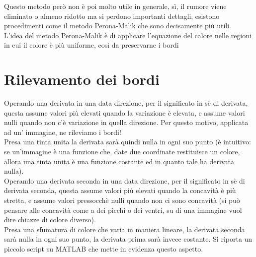 Questo metodo però non è poi molto utile in generale, sì, il rumore viene eliminato o almeno ridotto ma si perdono importanti dettagli, esistono procedimenti come il metodo Perona-Malik che sono decisamente più utili.\\
L'idea del metodo Perona-Malik è di applicare l'equazione del calore nelle regioni in cui il colore è più uniforme, così da preservarne i bordi


\section{Rilevamento dei bordi}

Operando una derivata in una data direzione, per il significato in sè di derivata, questa assume valori più elevati quando la variazione è elevata, e assume valori nulli quando non c'è variazione in quella direzione. Per questo motivo, applicata ad un' immagine, ne rileviamo i bordi!\\
Presa una tinta unita la derivata sarà quindi nulla in ogni suo punto (è intuitivo: se un'immagine è una funzione che, date due coordinate restituisce un colore, allora una tinta unita è una funzione costante ed in quanto tale ha derivata nulla).\\
\vspace{1em}
Operando una derivata seconda in una data direzione, per il significato in sè di derivata seconda, questa assume valori più elevati quando la concavità è più stretta, e assume valori pressocchè nulli quando non ci sono concavità (si può pensare alle concavità come a dei picchi o dei ventri, su di una immagine vuol dire chiazze di colore diverso).\\
Presa una sfumatura di colore che varia in maniera lineare, la derivata seconda sarà nulla in ogni suo punto, la derivata prima sarà invece costante. 
Si riporta un piccolo script su MATLAB che mette in evidenza questo aspetto.

